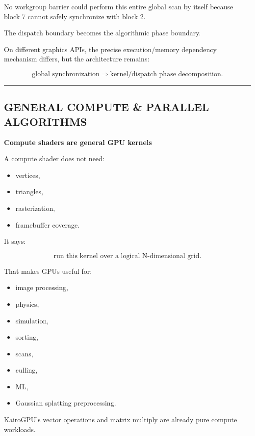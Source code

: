 No workgroup barrier could perform this entire global scan by itself because block 7 cannot safely synchronize with block 2.

The dispatch boundary becomes the algorithmic phase boundary.

On different graphics APIs, the precise execution/memory dependency mechanism differs, but the architecture remains:

\[
\boxed{
\text{global synchronization}
\Rightarrow
\text{kernel/dispatch phase decomposition}.
}
\]

\begin{center}\rule{0.5\linewidth}{0.5pt}\end{center}

\subsection{GENERAL COMPUTE \& PARALLEL ALGORITHMS}\label{01-foundations-i-ch009-general-compute-parallel-algorithms}

\textbf{Compute shaders are general GPU kernels}

A compute shader does not need:

\begin{itemize}
\tightlist
\item
  vertices,
\item
  triangles,
\item
  rasterization,
\item
  framebuffer coverage.
\end{itemize}

It says:

\[
\boxed{
\text{run this kernel over a logical N-dimensional grid}.
}
\]

That makes GPUs useful for:

\begin{itemize}
\tightlist
\item
  image processing,
\item
  physics,
\item
  simulation,
\item
  sorting,
\item
  scans,
\item
  culling,
\item
  ML,
\item
  Gaussian splatting preprocessing.
\end{itemize}

KairoGPU's vector operations and matrix multiply are already pure compute workloads.

